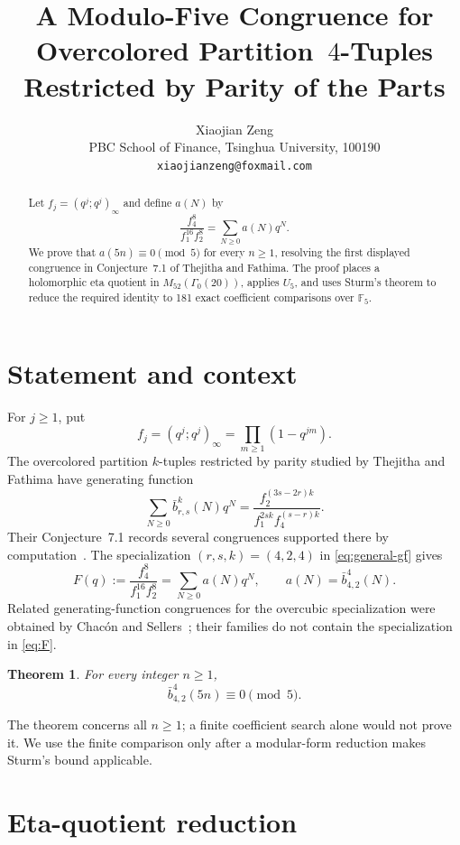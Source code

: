 \documentclass[11pt]{article}
\title{A Modulo-Five Congruence for Overcolored Partition\
       $4$-Tuples Restricted by Parity of the Parts}
\author{Xiaojian Zeng\\
PBC School of Finance, Tsinghua University, 100190\\
\texttt{xiaojianzeng@foxmail.com}}
\date{}
\newtheorem{theorem}{Theorem}
\begin{document}
\maketitle

\begin{abstract}
Let $f_j=(q^j;q^j)_\infty$ and define $a(N)$ by
\[
 \frac{f_4^8}{f_1^{16}f_2^8}=\sum_{N\geq0}a(N)q^N.
\]
We prove that $a(5n)\equiv0\pmod 5$ for every $n\geq1$, resolving the
first displayed congruence in Conjecture~7.1 of Thejitha and Fathima.
The proof places a holomorphic eta quotient in
$M_{52}(\Gamma_0(20))$, applies $U_5$, and uses Sturm's theorem to reduce
the required identity to 181 exact coefficient comparisons over
$\mathbb F_5$.
\end{abstract}

\section{Statement and context}

For $j\geq1$, put
\[
 f_j=(q^j;q^j)_\infty=\prod_{m\geq1}(1-q^{jm}).
\]
The overcolored partition $k$-tuples restricted by parity studied by
Thejitha and Fathima have generating function
\begin{equation}\label{eq:general-gf}
 \sum_{N\geq0}\bar b^k_{r,s}(N)q^N
 =\frac{f_2^{(3s-2r)k}}{f_1^{2sk}f_4^{(s-r)k}}.
\end{equation}
Their Conjecture~7.1 records several congruences supported there by
computation~\cite{ThejithaFathima2026}.  The specialization
$(r,s,k)=(4,2,4)$ in \eqref{eq:general-gf} gives
\begin{equation}\label{eq:F}
 F(q):=\frac{f_4^8}{f_1^{16}f_2^8}
      =\sum_{N\geq0}a(N)q^N,
 \qquad a(N)=\bar b^4_{4,2}(N).
\end{equation}
Related generating-function congruences for the overcubic specialization
were obtained by Chac\'on and Sellers~\cite{ChaconSellers2026}; their
families do not contain the specialization in \eqref{eq:F}.

\begin{theorem}\label{thm:main}
For every integer $n\geq1$,
\[
 \bar b^4_{4,2}(5n)\equiv0\pmod5.
\]
\end{theorem}

The theorem concerns all $n\geq1$; a finite coefficient search alone would
not prove it.  We use the finite comparison only after a modular-form
reduction makes Sturm's bound applicable.

\section{Eta-quotient reduction}
\end{document}
